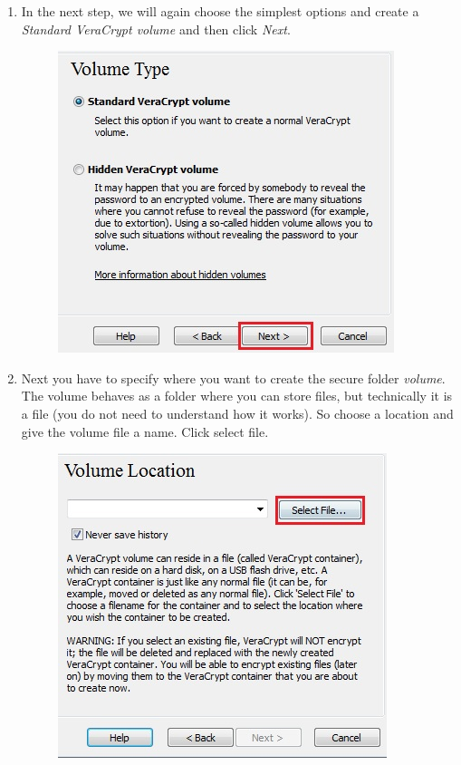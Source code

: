 \documentclass{tufte-handout}
\begin{document}
\begin{enumerate}
	\newpage
	
	\item In the next step, we will again choose the simplest options and create a \textit{Standard VeraCrypt volume} and then click \textit{Next}.
	\begin{figure}
		\includegraphics[width=.75\linewidth]{img/vc_install_3.png}
	\end{figure}
	\FloatBarrier
	
	\item Next you have to specify where you want to create the secure folder \textit{volume}. The volume behaves as a folder where you can store files, but technically it is a file (you do not need to understand how it works). So choose a location and give the volume file a name. Click select file. 
	\begin{figure}%
		\includegraphics[width=.75\linewidth]{img/vc_install_4.png}
	\end{figure} 
	\FloatBarrier
	

\end{enumerate}
\end{document}
